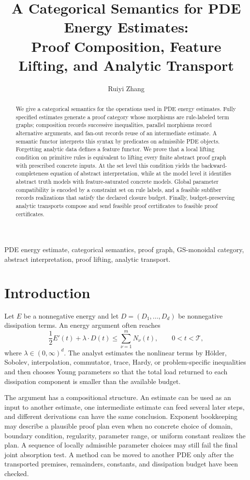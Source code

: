 \documentclass[10pt,journal,a4paper]{IEEEtran}
\title{A Categorical Semantics for PDE Energy Estimates:\\
Proof Composition, Feature Lifting, and Analytic Transport}
\author{Ruiyi Zhang}
\theoremstyle{definition}
\begin{document}
\maketitle

\begin{abstract}
We give a categorical semantics for the operations used in PDE energy estimates. Fully specified estimates generate a proof category whose morphisms are rule-labeled term graphs; composition records successive inequalities, parallel morphisms record alternative arguments, and fan-out records reuse of an intermediate estimate. A semantic functor interprets this syntax by predicates on admissible PDE objects. Forgetting analytic data defines a feature functor. We prove that a local lifting condition on primitive rules is equivalent to lifting every finite abstract proof graph with prescribed concrete inputs. At the set level this condition yields the backward-completeness equation of abstract interpretation, while at the model level it identifies abstract truth models with feature-saturated concrete models. Global parameter compatibility is encoded by a constraint set on rule labels, and a feasible subfiber records realizations that satisfy the declared closure budget. Finally, budget-preserving analytic transports compose and send feasible proof certificates to feasible proof certificates.
\end{abstract}

\begin{IEEEkeywords}
PDE energy estimate, categorical semantics, proof graph, GS-monoidal category, abstract interpretation, proof lifting, analytic transport.
\end{IEEEkeywords}

\section{Introduction}

Let $E$ be a nonnegative energy and let $D=(D_1,\ldots,D_d)$ be nonnegative dissipation terms. An energy argument often reaches
\[
  \frac{1}{2}E'(t)+\lambda\mathbin{\cdot}D(t)
  \leq\sum_{\nu=1}^m N_\nu(t),
  \qquad 0<t<\mathcal T,
\]
where $\lambda\in(0,\infty)^d$. The analyst estimates the nonlinear terms by H\"older, Sobolev, interpolation, commutator, trace, Hardy, or problem-specific inequalities and then chooses Young parameters so that the total load returned to each dissipation component is smaller than the available budget.

The argument has a compositional structure. An estimate can be used as an input to another estimate, one intermediate estimate can feed several later steps, and different derivations can have the same conclusion. Exponent bookkeeping may describe a plausible proof plan even when no concrete choice of domain, boundary condition, regularity, parameter range, or uniform constant realizes the plan. A sequence of locally admissible parameter choices may still fail the final joint absorption test. A method can be moved to another PDE only after the transported premises, remainders, constants, and dissipation budget have been checked.
\end{document}
